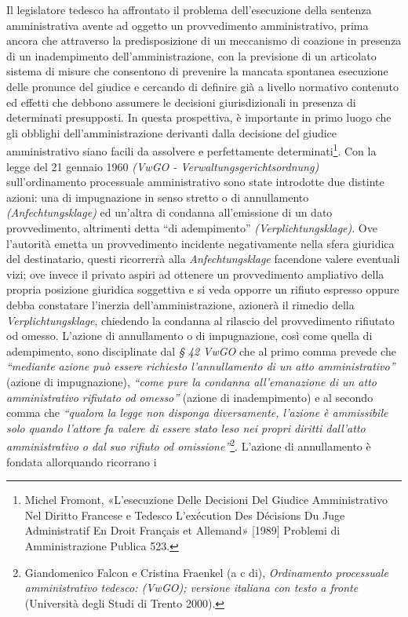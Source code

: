 \documentclass[12pt,it,a4paper,]{report}
\begin{document}
Il legislatore tedesco ha affrontato il problema dell'esecuzione della
sentenza amministrativa avente ad oggetto un provvedimento
amministrativo, prima ancora che attraverso la predisposizione di un
meccanismo di coazione in presenza di un inadempimento
dell'amministrazione, con la previsione di un articolato sistema di
misure che consentono di prevenire la mancata spontanea esecuzione delle
pronunce del giudice e cercando di definire già a livello normativo
contenuto ed effetti che debbono assumere le decisioni giurisdizionali
in presenza di determinati presupposti. In questa prospettiva, è
importante in primo luogo che gli obblighi dell'amministrazione
derivanti dalla decisione del giudice amministrativo siano facili da
assolvere e perfettamente determinati\footnote{{Michel Fromont,
  {«L'esecuzione Delle Decisioni Del Giudice Amministrativo Nel Diritto
  Francese e Tedesco {L}'exécution Des Décisions Du Juge Administratif
  En Droit Français et Allemand»} {[}1989{]} Problemi di Amministrazione
  Publica 523.}}. Con la legge del 21 gennaio 1960 \emph{(VwGO -
Verwaltungsgerichtsordnung)} sull'ordinamento processuale amministrativo
sono state introdotte due distinte azioni: una di impugnazione in senso
stretto o di annullamento \emph{(Anfechtungsklage)} ed un'altra di
condanna all'emissione di un dato provvedimento, altrimenti detta ``di
adempimento'' \emph{(Verplichtungsklage)}. Ove l'autorità emetta un
provvedimento incidente negativamente nella sfera giuridica del
destinatario, questi ricorrerrà alla \emph{Anfechtungsklage} facendone
valere eventuali vizi; ove invece il privato aspiri ad ottenere un
provvedimento ampliativo della propria posizione giuridica soggettiva e
si veda opporre un rifiuto espresso oppure debba constatare l'inerzia
dell'amministrazione, azionerà il rimedio della
\emph{Verplichtungsklage}, chiedendo la condanna al rilascio del
provvedimento rifiutato od omesso. L'azione di annullamento o di
impugnazione, così come quella di adempimento, sono disciplinate dal
\emph{§ 42 VwGO} che al primo comma prevede che \emph{``mediante azione
può essere richiesto l'annullamento di un atto amministrativo''} (azione
di impugnazione), \emph{``come pure la condanna all'emanazione di un
atto amministrativo rifiutato od omesso''} (azione di inadempimento) e
al secondo comma che \emph{``qualora la legge non disponga diversamente,
l'azione è ammissibile solo quando l'attore fa valere di essere stato
leso nei propri diritti dall'atto amministrativo o dal suo rifiuto od
omissione''}\footnote{{Giandomenico Falcon e Cristina Fraenkel (a c di),
  \emph{Ordinamento processuale amministrativo tedesco: (VwGO); versione
  italiana con testo a fronte} ({Università degli Studi di Trento}
  2000).}}. L'azione di annullamento è fondata allorquando ricorrano i
\end{document}
